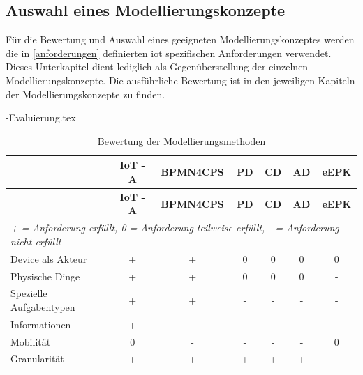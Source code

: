 \documentclass[a4paper, 12pt, twoside, headsepline=true]{scrartcl} %
\begin{document}
\subsection{Auswahl eines Modellierungskonzepte}\label{auswahl}
Für die Bewertung und Auswahl eines geeigneten Modellierungskonzeptes werden die in \ref{anforderungen} definierten \ac{iot} spezifischen Anforderungen verwendet. Dieses Unterkapitel dient lediglich als Gegenüberstellung der einzelnen Modellierungskonzepte.  Die ausführliche Bewertung ist in den jeweiligen Kapiteln der Modellierungskonzepte zu finden. 


\begin{filecontents}{\jobname-Evaluierung.tex}
	\begin{longtable}{| l |c|c|c|c|c|c|}
		\caption{Bewertung der Modellierungsmethoden}\\ \hline
		\label{table:Evaluierung}
		 & \textbf{IoT - A} & \textbf{BPMN4CPS} & \textbf{PD}\footnotemark[1] & \textbf{CD}\footnotemark[2] & \textbf{AD}\footnotemark[3] &\textbf{eEPK}  \\\hline
		\endfirsthead %
		
		& \textbf{IoT - A} & \textbf{BPMN4CPS} & \textbf{PD}\footnotemark[1] & \textbf{CD}\footnotemark[2] & \textbf{AD}\footnotemark[3] &\textbf{eEPK} \\ \hline		
		\endhead %
		\multicolumn{7}{P{10.8cm}}{\textit{+ = Anforderung erfüllt, 0 = Anforderung teilweise erfüllt, - = Anforderung nicht erfüllt}}\\
		\endlastfoot


		Device als Akteur & +  & + & 0 & 0 & 0 & 0 \\ \hline
		
		Physische Dinge  & + & + & 0 & 0 & 0 & - \\ \hline

		Spezielle Aufgabentypen & + & + & - & - & -& - \\ \hline

		Informationen  & + & - & - & - & - & - \\ \hline

		Mobilität & 0 & - & - & - & - & 0 \\ \hline

		Granularität & + & + & + & + & + & - \\ \hline

	\end{longtable}
\end{filecontents}
\end{document}
